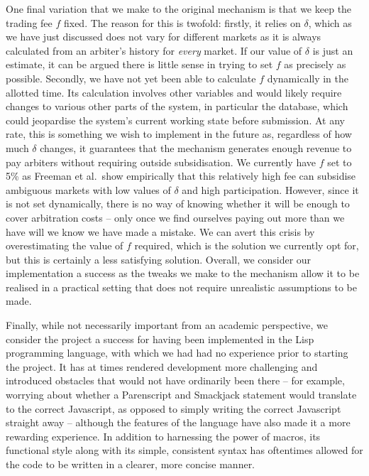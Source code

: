One final variation that we make to the original mechanism is that we keep the
trading fee $f$ fixed. The reason for this is twofold: firstly, it relies on
$\delta$, which as we have just discussed does not vary for different markets
as it is always calculated from an arbiter's history for \emph{every} market.
If our value of $\delta$ is just an estimate, it can be argued there is little
sense in trying to set $f$ as precisely as possible. Secondly, we have not yet
been able to calculate $f$ dynamically in the allotted time. Its calculation
involves other variables and would likely require changes to various other
parts of the system, in particular the database, which could jeopardise the
system's current working state before submission. At any rate, this is
something we wish to implement in the future as, regardless of how much
$\delta$ changes, it guarantees that the mechanism generates enough revenue to
pay arbiters without requiring outside subsidisation. We currently have $f$ set
to 5\% as Freeman et al.\ show empirically that this relatively high fee can
subsidise ambiguous markets with low values of $\delta$ and high participation.
However, since it is not set dynamically, there is no way of knowing whether it
will be enough to cover arbitration costs -- only once we find ourselves paying
out more than we have will we know we have made a mistake. We can avert this
crisis by overestimating the value of $f$ required, which is the solution we
currently opt for, but this is certainly a less satisfying solution. Overall,
we consider our implementation a success as the tweaks we make to the mechanism
allow it to be realised in a practical setting that does not require
unrealistic assumptions to be made.

Finally, while not necessarily important from an academic perspective, we
consider the project a success for having been implemented in the Lisp
programming language, with which we had had no experience prior to starting the
project. It has at times rendered development more challenging and introduced
obstacles that would not have ordinarily been there -- for example, worrying
about whether a Parenscript and Smackjack statement would translate to the
correct Javascript, as opposed to simply writing the correct Javascript
straight away -- although the features of the language have also made it a more
rewarding experience. In addition to harnessing the power of macros, its
functional style along with its simple, consistent syntax has oftentimes
allowed for the code to be written in a clearer, more concise manner.

